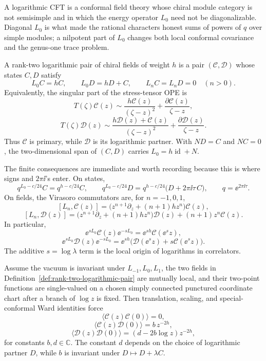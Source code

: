 A logarithmic CFT is a conformal field theory whose chiral module category is
not semisimple and in which the energy operator \(L_0\) need not be
diagonalizable.  Diagonal \(L_0\) is what made the rational characters honest
sums of powers of \(q\)
over simple modules; a nilpotent part of \(L_0\) changes both local conformal
covariance and the genus-one trace problem.

\begin{definition}
\label{def:rank-two-logarithmic-pair}
A rank-two logarithmic pair of chiral fields of weight \(h\) is a pair
\((\mathcal C,\mathcal D)\) whose states \(C,D\) satisfy
\[
  L_0C=hC,\qquad L_0D=hD+C,\qquad L_nC=L_nD=0\quad(n>0).
\]
Equivalently, the singular part of the stress-tensor OPE is
\[
  T(\zeta)\mathcal C(z)
  \sim
  \frac{h\mathcal C(z)}{(\zeta-z)^2}
  +
  \frac{\partial\mathcal C(z)}{\zeta-z},
\]
\[
  T(\zeta)\mathcal D(z)
  \sim
  \frac{h\mathcal D(z)+\mathcal C(z)}{(\zeta-z)^2}
  +
  \frac{\partial\mathcal D(z)}{\zeta-z}.
\]
Thus \(\mathcal C\) is primary, while \(\mathcal D\) is its logarithmic
partner.  With \(N D=C\) and \(NC=0\), the two-dimensional span of
\((C,D)\) carries \(L_0=h\operatorname{id}+N\).
\end{definition}

The finite consequences are immediate and worth recording because this is
where signs and \(2\pi\ii\)'s enter.  On states,
\[
  q^{L_0-c/24}C=q^{h-c/24}C,\qquad
  q^{L_0-c/24}D=q^{h-c/24}\bigl(D+2\pi\ii\tau\,C\bigr),
  \qquad q=\ee^{2\pi\ii\tau}.
\]
On fields, the Virasoro commutators are, for \(n=-1,0,1\),
\[
  [L_n,\mathcal C(z)]
  =
  \bigl(z^{n+1}\partial_z+(n+1)hz^n\bigr)\mathcal C(z),
\]
\[
  [L_n,\mathcal D(z)]
  =
  \bigl(z^{n+1}\partial_z+(n+1)hz^n\bigr)\mathcal D(z)
  +(n+1)z^n\mathcal C(z).
\]
In particular,
\[
  \ee^{sL_0}\mathcal C(z)\ee^{-sL_0}
  =
  \ee^{sh}\mathcal C(\ee^s z),
\]
\[
  \ee^{sL_0}\mathcal D(z)\ee^{-sL_0}
  =
  \ee^{sh}\bigl(\mathcal D(\ee^s z)+s\mathcal C(\ee^s z)\bigr).
\]
The additive \(s=\log\lambda\) term is the local origin of logarithms in
correlators.

\begin{proposition}
\label{prop:logarithmic-pair-two-point-functions}
Assume the vacuum is invariant under \(L_{-1},L_0,L_1\), the two fields in
Definition~\ref{def:rank-two-logarithmic-pair} are mutually local, and their
two-point functions are single-valued on a chosen simply connected
punctured coordinate chart after a branch of \(\log z\) is fixed.  Then
translation, scaling, and special-conformal Ward identities force
\[
  \langle\mathcal C(z)\mathcal C(0)\rangle=0,
\]
\[
  \langle\mathcal C(z)\mathcal D(0)\rangle
  =
  b\,z^{-2h},
\]
\[
  \langle\mathcal D(z)\mathcal D(0)\rangle
  =
  (d-2b\log z)z^{-2h},
\]
for constants \(b,d\in\mathbb C\).  The constant \(d\) depends on the choice
of logarithmic partner \(D\), while \(b\) is invariant under
\(D\mapsto D+\lambda C\).
\end{proposition}

